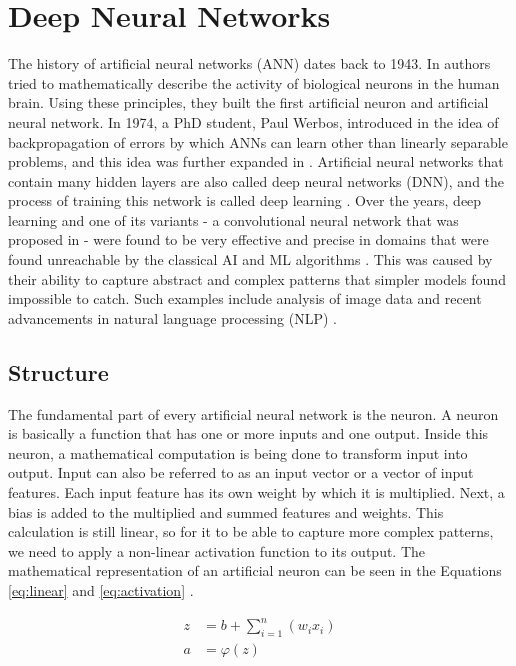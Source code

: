 \chapter{Deep Neural Networks}
\label{chapter:dnn}

The history of artificial neural networks (ANN) dates back to 1943. In \cite{McCulloch1943} authors tried to mathematically describe the activity of biological neurons in the human brain. Using these principles, they built the first artificial neuron and artificial neural network. In 1974, a PhD student, Paul Werbos, introduced in \cite{Werbos1974} the idea of backpropagation of errors by which ANNs can learn  other than linearly separable problems, and this idea was further expanded in \cite{Rumelhart1986}. Artificial neural networks that contain many hidden layers are also called deep neural networks (DNN), and the process of training this network is called deep learning \cite{LeCun2015}. Over the years, deep learning and one of its variants - a convolutional neural network that was proposed in \cite{LeCun2015-2} - were found to be very effective and precise in domains that were found unreachable by the classical AI and ML algorithms \cite{LeCun2015}. This was caused by their ability to capture abstract and complex patterns that simpler models found impossible to catch. Such examples include analysis of image data \cite{Farabet2013, Alzubaidi2021} and recent advancements in natural language processing (NLP) \cite{Deng2018}.

\section{Structure}
The fundamental part of every artificial neural network is the neuron. A neuron is basically a function that has one or more inputs and one output. Inside this neuron, a mathematical computation is being done to transform input into output. Input can also be referred to as an input vector or a vector of input features. Each input feature has its own weight by which it is multiplied. Next, a bias is added to the multiplied and summed features and weights. This calculation is still linear, so for it to be able to capture more complex patterns, we need to apply a non-linear activation function to its output. The mathematical representation of an artificial neuron can be seen in the Equations \ref{eq:linear} and \ref{eq:activation} \cite{Goodfellow2016}.

\begin{align}
\label{eq:linear}
    z &= b + \sum_{i=1}^n (w_i x_i) \\
\label{eq:activation}
    a &= \varphi(z)
\end{align}

